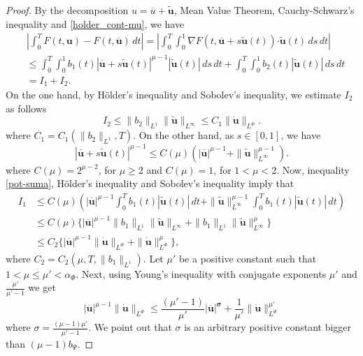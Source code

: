\documentclass[twoside]{article}
\theoremstyle{remark}
\newcommand{\orlnor}{\|_{L^{\Phi}}}
\renewcommand{\b}[1]{\boldsymbol{#1}}
\newcommand{\ccdot}{\b{\cdot}}
\renewcommand{\leq}{\leqslant}
\renewcommand{\geq}{\geqslant}
\begin{document}
\begin{proof} 
By the decomposition $u=\overline{u}+\b{\tilde{u}}$,  Mean Value Theorem, Cauchy-Schwarz's inequality 
and \eqref{holder_cont-mu}, we have
\begin{equation}\label{cota-diferencia-F}
\begin{split}
&\left|\int_0^T F(t,\b{u})-F(t,\b{\overline{u}})\,dt\right|=
\left|\int_0^T \int_0^1 \nabla F(t,\b{\overline{u}}+s\b{\tilde{u}}(t))\ccdot \b{\tilde{u}}(t) \,ds \,dt\right|
\\
&\leq \int_0^T \int_0^1 b_1(t)|\b{\overline{u}}+s\b{\tilde{u}}(t)|^{\mu-1}|\b{\tilde{u}}(t)|\,ds\,dt+
\int_0^T \int_0^1 b_2(t)|\b{\tilde{u}}(t)|\,ds\,dt
\\
&=I_1+I_2.
\end{split}
\end{equation}
On the one hand, by H\"older's inequality and Sobolev's inequality, we estimate $I_2$ as follows
\begin{equation}\label{cota-i2}
I_2\leq \|b_2\|_{L^1} \|\b{\tilde{u}}\|_{L^{\infty}}\leq
C_1\|\b{\dot u}\orlnor.
\end{equation}
 where $C_1=C_1(\|b_2\|_{L^1}, T)$. On the other hand, as $s\in [0,1]$, we have
\begin{equation}\label{pot-suma}
|\b{\overline{u}}+s\b{\tilde{u}}(t)|^{\mu-1}\leq
C(\mu)(|\b{\overline{u}}|^{\mu-1}+\|\b{\tilde{u}}\|_{L^{\infty}}^{\mu-1}).
\end{equation}
where $C(\mu)=2^{\mu-2}$, for $\mu\geq 2$ and $C(\mu)=1$, for $1<\mu<2$. Now,  inequality \eqref{pot-suma}, H\"older's inequality and Sobolev's inequality imply that
\begin{equation}\label{cota-i1}
\begin{split}
I_1&\leq 
C(\mu)\left(|\b{\overline{u}}|^{\mu-1} \int_0^T b_1(t) |\b{\tilde{u}}(t)|\,dt+
\|\b{\tilde{u}}\|^{\mu-1}_{L^{\infty}} \int_0^T b_1(t)|\b{\tilde{u}}(t)| \,dt\right)
\\
&\leq C(\mu)\bigg\{ |\b{\overline{u}}|^{\mu-1} \|b_1\|_{L^1} \|\b{\tilde{u}}\|_{L^{\infty}}+
 \|b_1\|_{L^1}\|\b{\tilde{u}}\|^{\mu}_{L^\infty}\bigg\}
\\
&\leq C_2 \bigg\{ |\b{\overline{u}}|^{\mu-1} \|\b{\dot{u}}\orlnor+ \|\b{\dot u}\orlnor^{\mu}\bigg\},
\end{split}
\end{equation}
where $C_2=C_2(\mu,T, \|b_1\|_{L^1} )$. Let $\mu'$ be a positive constant such that $1<\mu\leq \mu'<\alpha_{\Phi}$. 
Next, using Young's inequality with conjugate exponents $\mu'$ and $\frac{\mu'}{\mu'-1}$ 
 we get
\begin{equation}\label{cota-i1-parcial}
|\b{\overline{u}}|^{\mu-1}   \|\b{\dot{u}}\orlnor
\leq \frac{(\mu'-1)}{\mu'}|\b{\overline{u}|^{\sigma}}
+\frac{1}{\mu'} \|\b{\dot{u}}\orlnor^{\mu'}
\end{equation}
where $\sigma=\frac{(\mu-1) \mu'}{\mu'-1}$. We point out that $\sigma$ is an arbitrary positive constant bigger than $(\mu-1)b_{\Psi}$.


\end{proof}
\end{document}
